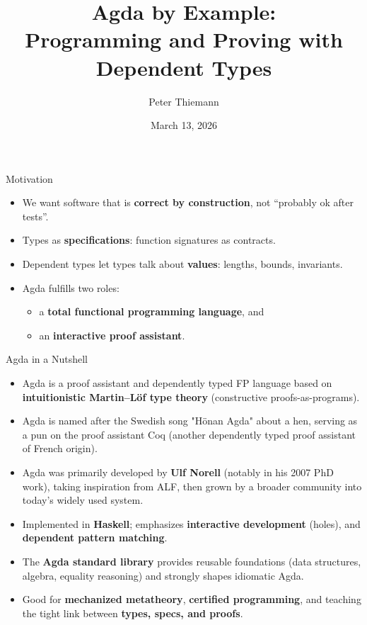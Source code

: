 \documentclass[aspectratio=169]{beamer}
\title[Agda by Example]{Agda by Example:\\Programming and Proving with Dependent Types}
\author{Peter Thiemann}
\institute{Freiburg University}
\date{March 13, 2026}
\begin{document}
\begin{frame}
  \titlepage
\end{frame}

\begin{frame}{Motivation}
  \begin{itemize}
    \item We want software that is \textbf{correct by construction}, not “probably ok after tests”.
    \item Types as \textbf{specifications}: function signatures as contracts.
    \item Dependent types let types talk about \textbf{values}: lengths, bounds, invariants.
    \item Agda fulfills two roles:
      \begin{itemize}
        \item a \textbf{total functional programming language}, and
        \item an \textbf{interactive proof assistant}.
      \end{itemize}
  \end{itemize}
\end{frame}

\begin{frame}{Agda in a Nutshell}
\small
\begin{itemize}
  \item Agda is a proof assistant and dependently typed FP language based on
  \textbf{intuitionistic Martin--L\"of type theory} (constructive proofs-as-programs).

  \item Agda is named after the Swedish song "Hönan Agda" about a
    hen, serving as a pun on the proof assistant Coq (another
    dependently typed proof assistant of French origin).

  \item Agda was primarily developed by \textbf{Ulf Norell}
    (notably in his 2007 PhD work), taking inspiration from ALF,
    then grown by a broader community into today’s widely used
    system. 

  \item Implemented in \textbf{Haskell}; emphasizes
    \textbf{interactive development} (holes), and \textbf{dependent pattern matching}.

  \item The \textbf{Agda standard library} provides reusable foundations
  (data structures, algebra, equality reasoning) and strongly shapes idiomatic Agda.

  \item Good for \textbf{mechanized metatheory}, \textbf{certified programming},
    and teaching the tight link between \textbf{types, specs, and proofs}.
\end{itemize}
\end{frame}
\end{document}
